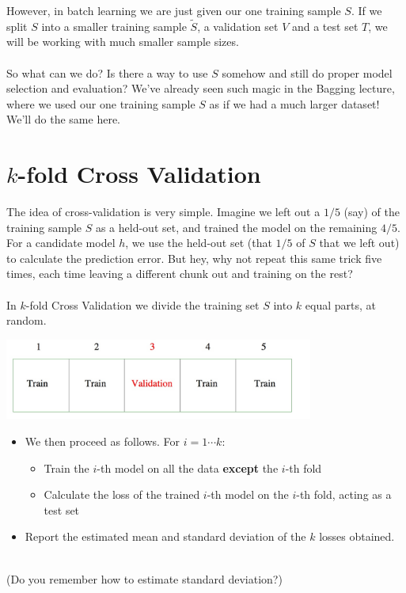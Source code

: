 \documentclass[11pt]{article}
\begin{document}
However, in batch learning we are just given our one training sample $S$. 
If we split $S$ into a smaller training sample $\tilde{S}$, a validation set $V$
and a test set $T$, we will be working with much smaller sample sizes.
\\~\\
So what can we do? Is there a way to use $S$ somehow and still do proper model
selection and evaluation? We've already seen such magic in the Bagging lecture,
where we used our one training sample $S$ as if we had a much larger dataset!
We'll do the same here.

\section{$k$-fold Cross Validation}

The idea of cross-validation is very simple. Imagine we left out a $1/5$ (say)
of the training sample $S$ as a held-out set, and trained the model on the
remaining $4/5$. For a candidate model $h$, we use the held-out set (that $1/5$
of $S$ that we left out) to calculate the prediction error. But hey, why not
repeat this same trick five times, each time leaving a different chunk out and
training on the rest?
\\~\\
In $k$-fold Cross Validation we divide the training set $S$ into $k$ equal
parts, at random. 

\begin{center}
  \includegraphics[width=4in]{cv.jpeg}  
    \end{center}
    \begin{itemize}
      \item We then proceed as follows. For $i=1\cdots k$:
      \begin{itemize}
        \item Train the $i$-th model on all the data {\bf except} the $i$-th fold
        \item Calculate the loss of the trained $i$-th model on the $i$-th fold, acting as a test set
      \end{itemize}
    \item Report the estimated mean and standard deviation of the $k$ losses obtained.
  \end{itemize}
~\\
  (Do you remember how to estimate standard deviation?)
\end{document}
